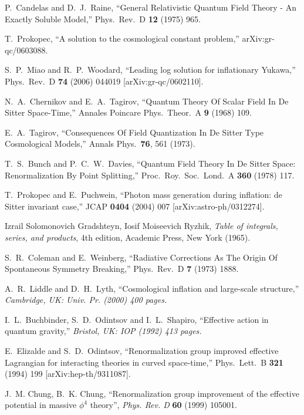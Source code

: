 \begin{thebibliography}{999}
  P.~Candelas and D.~J.~Raine,
  ``General Relativistic Quantum Field Theory - An Exactly Soluble Model,''
  Phys.\ Rev.\ D {\bf 12} (1975) 965.

  T.~Prokopec,
  ``A solution to the cosmological constant problem,''
  arXiv:gr-qc/0603088.

  S.~P.~Miao and R.~P.~Woodard,
  ``Leading log solution for inflationary Yukawa,''
  Phys.\ Rev.\  D {\bf 74} (2006) 044019
  [arXiv:gr-qc/0602110].

 N.~A.~Chernikov and E.~A.~Tagirov,
``Quantum Theory Of Scalar Field In De Sitter Space-Time,''
Annales Poincare Phys.\ Theor.\ A {\bf 9} (1968) 109.

E.~A.~Tagirov, ``Consequences Of Field Quantization In De Sitter
Type Cosmological Models,'' Annals Phys.\  {\bf 76}, 561 (1973).

T.~S.~Bunch and P.~C.~W.~Davies, ``Quantum Field Theory In De
Sitter Space: Renormalization By Point Splitting,'' Proc.\ Roy.\
Soc.\ Lond.\ A {\bf 360} (1978) 117.

  T.~Prokopec and E.~Puchwein,
  ``Photon mass generation during inflation: de Sitter invariant case,''
  JCAP {\bf 0404} (2004) 007
  [arXiv:astro-ph/0312274].

Izrail Solomonovich Gradshteyn, Iosif Moiseevich Ryzhik,
{\it Table of integrals, series, and products}, 4th edition,
Academic Press, New York (1965).

 S.~R.~Coleman and E.~Weinberg,
``Radiative Corrections As The Origin Of Spontaneous Symmetry
Breaking,'' Phys.\ Rev.\ D {\bf 7} (1973) 1888.

  A.~R.~Liddle and D.~H.~Lyth,
  ``Cosmological inflation and large-scale structure,''
{\it  Cambridge, UK: Univ. Pr. (2000) 400 pages.}

  I.~L.~Buchbinder, S.~D.~Odintsov and I.~L.~Shapiro,
  ``Effective action in quantum gravity,''
{\it  Bristol, UK: IOP (1992) 413 pages.}

  E.~Elizalde and S.~D.~Odintsov,
  ``Renormalization group improved effective Lagrangian for interacting
  theories in curved space-time,''
  Phys.\ Lett.\  B {\bf 321} (1994) 199
  [arXiv:hep-th/9311087].

 J.~M. Chung, B.~K. Chung,
 ``Renormalization group improvement of the effective potential
 in massive $\phi^4$ theory'', \textit{Phys. Rev. D} \textbf{60} (1999) 105001.


\end{thebibliography}
